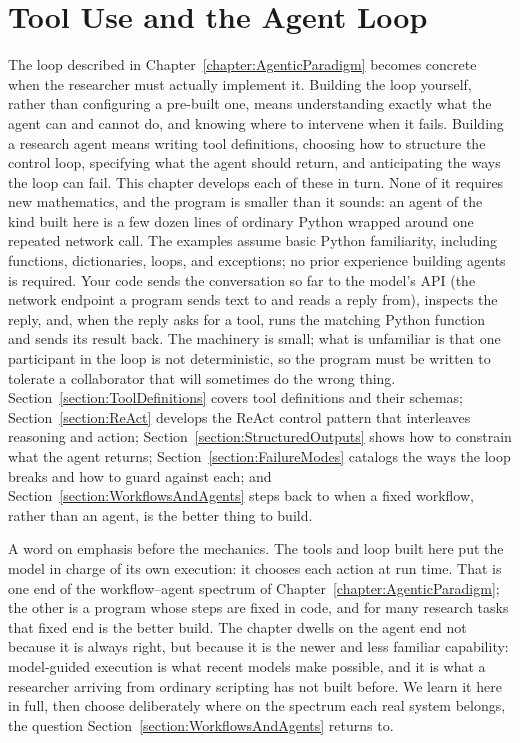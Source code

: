 \chapter{Tool Use and the Agent Loop}
\label{chapter:AgentLoop}

The loop described in Chapter~\ref{chapter:AgenticParadigm} becomes concrete when the researcher must actually implement it.
Building the loop yourself, rather than configuring a pre-built one, means understanding exactly what the agent can and cannot do, and knowing where to intervene when it fails.
Building a research agent means writing tool definitions, choosing how to structure the control loop, specifying what the agent should return, and anticipating the ways the loop can fail.
This chapter develops each of these in turn.
None of it requires new mathematics, and the program is smaller than it sounds: an agent of the kind built here is a few dozen lines of ordinary Python wrapped around one repeated network call.
The examples assume basic Python familiarity, including functions, dictionaries, loops, and exceptions; no prior experience building agents is required.
Your code sends the conversation so far to the model's API (the network endpoint a program sends text to and reads a reply from), inspects the reply, and, when the reply asks for a tool, runs the matching Python function and sends its result back.
The machinery is small; what is unfamiliar is that one participant in the loop is not deterministic, so the program must be written to tolerate a collaborator that will sometimes do the wrong thing.
Section~\ref{section:ToolDefinitions} covers tool definitions and their schemas; Section~\ref{section:ReAct} develops the ReAct control pattern that interleaves reasoning and action; Section~\ref{section:StructuredOutputs} shows how to constrain what the agent returns; Section~\ref{section:FailureModes} catalogs the ways the loop breaks and how to guard against each; and Section~\ref{section:WorkflowsAndAgents} steps back to when a fixed workflow, rather than an agent, is the better thing to build.

A word on emphasis before the mechanics.
The tools and loop built here put the model in charge of its own execution: it chooses each action at run time.
That is one end of the workflow--agent spectrum of Chapter~\ref{chapter:AgenticParadigm}; the other is a program whose steps are fixed in code, and for many research tasks that fixed end is the better build.
The chapter dwells on the agent end not because it is always right, but because it is the newer and less familiar capability: model-guided execution is what recent models make possible, and it is what a researcher arriving from ordinary scripting has not built before.
We learn it here in full, then choose deliberately where on the spectrum each real system belongs, the question Section~\ref{section:WorkflowsAndAgents} returns to.

